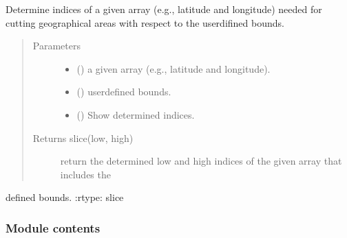 \documentclass[a4paper,11pt,english]{sphinxmanual}
\begin{document}
\begin{fulllineitems}
\label{\detokenize{envlib:envlib.weather_store.get_bound_indexes}}
\sphinxAtStartPar
Determine indices of a given array (e.g., latitude and longitude) needed for cutting geographical areas with respect to the user\sphinxhyphen{}difined bounds.
\begin{quote}\begin{description}
\item[{Parameters}] \leavevmode\begin{itemize}
\item {} 
\sphinxAtStartPar
{} () \textendash{} a given array (e.g., latitude and longitude).

\item {} 
\sphinxAtStartPar
{} () \textendash{} user\sphinxhyphen{}defined bounds.

\item {} 
\sphinxAtStartPar
{} () \textendash{} Show determined indices.

\end{itemize}

\item[{Returns slice(low, high)}] \leavevmode
\sphinxAtStartPar
return the determined low and high indices of the given array that includes the

\end{description}\end{quote}

\sphinxAtStartPar
defined bounds.
:rtype: slice

\end{fulllineitems}



\subsubsection{Module contents}
\label{\detokenize{envlib:module-envlib}}\label{\detokenize{envlib:module-contents}}
\end{document}
